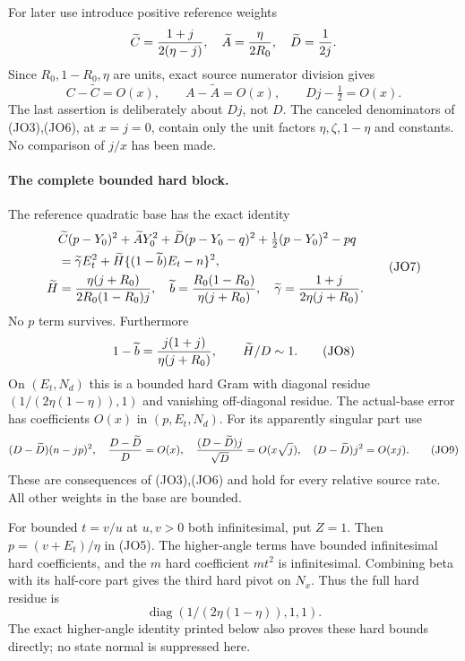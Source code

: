 For later use introduce positive reference weights
\[
 \widetilde C={1+j\over2(\eta-j)},\quad
 \widetilde A={\eta\over2R_0},\quad
 \widetilde D={1\over2j}.
\]
Since $R_0,1-R_0,\eta$ are units, exact source numerator division gives
\[
 C-\widetilde C=O(x),\qquad A-\widetilde A=O(x),\qquad
 Dj-\tfrac12=O(x).                                    \tag{JO6}
\]
The last assertion is deliberately about $Dj$, not $D$. The canceled
denominators of (JO3),(JO6), at $x=j=0$, contain only the unit
factors $\eta,\zeta,1-\eta$ and constants. No comparison of $j/x$
has been made.

\paragraph{The complete bounded hard block.}
The reference quadratic base has the exact identity
\[
 \begin{aligned}
 &\widetilde C(p-Y_0)^2+\widetilde A Y_0^2+
 \widetilde D(p-Y_0-q)^2+\tfrac12(p-Y_0)^2-pq\\
 &=\widetilde\gamma E_t^2+
 \widetilde H\{(1-\widetilde b)E_t-n\}^2,               \\
 \widetilde H&={\eta(j+R_0)\over2R_0(1-R_0)j},\quad
 \widetilde b={R_0(1-R_0)\over\eta(j+R_0)},\quad
 \widetilde\gamma={1+j\over2\eta(j+R_0)} .
 \end{aligned} \tag{JO7}
\]
No $p$ term survives. Furthermore
\[
 1-\widetilde b={j(1+j)\over\eta(j+R_0)},\qquad
 \widetilde H/D\sim1.                                 \tag{JO8}
\]
On $(E_t,N_d)$ this is a bounded hard Gram with diagonal residue
$(1/(2\eta(1-\eta)),1)$ and vanishing off-diagonal residue.
The actual-base error has coefficients $O(x)$ in $(p,E_t,N_d)$.
For its apparently singular part use
\[
 (D-\widetilde D)(n-jp)^2,\quad
 {D-\widetilde D\over D}=O(x),\quad
 {(D-\widetilde D)j\over\sqrt D}=O(x\sqrt j),\quad
 (D-\widetilde D)j^2=O(xj).                           \tag{JO9}
\]
These are consequences of (JO3),(JO6) and hold for every relative
source rate. All other weights in the base are bounded.

For bounded $t=v/u$ at $u,v>0$ both infinitesimal, put $Z=1$.
Then $p=(v+E_t)/\eta$ in (JO5). The higher-angle terms have
bounded infinitesimal hard coefficients, and the $m$ hard coefficient
$m t^2$ is infinitesimal. Combining beta with its half-core part gives
the third hard pivot on $N_x$. Thus the full hard residue is
\[
                 \operatorname{diag}(1/(2\eta(1-\eta)),1,1).
                                                               \tag{JO10}
\]
The exact higher-angle identity printed below also proves these hard
bounds directly; no state normal is suppressed here.

